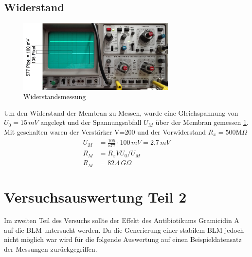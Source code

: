 \documentclass{include/thesisclass3}
\newcommand{\e}[1]{\,\si{#1}}
\begin{document}
\section{Widerstand}
\begin{figure}[ht]
	\begin{center}
		\includegraphics[width=0.7\textwidth]{images/Widerstand.png}
		\caption{Widerstandsmessung}
		\label{resistance}
	\end{center}
\end{figure}
Um den Widerstand der Membran zu Messen, wurde eine Gleichspannung von $U_0=15\e{mV}$ angelegt und der Spannungsabfall $U_M$ über der Membran gemessen \ref{resistance}. Mit geschalten waren der Verstärker V=200 und der Vorwiderstand $R_x=500\text{M}\Omega$
\begin{align*}
	U_M&=\frac{105}{577}\cdot 100\e{mV}= 2.7 \e{mV}\\
	R_M&=R_x V U_0/U_M\\
	R_M&=82.4\e{G\Omega}
\end{align*}

\chapter{Versuchsauswertung Teil 2}
Im zweiten Teil des Versuchs sollte der Effekt des Antibiotikums Gramicidin A auf die BLM untersucht werden. Da die Generierung einer stabilem BLM jedoch nicht möglich war wird für die folgende Auswertung auf einen Beispieldatensatz der Messungen zurückgegriffen.
\end{document}
